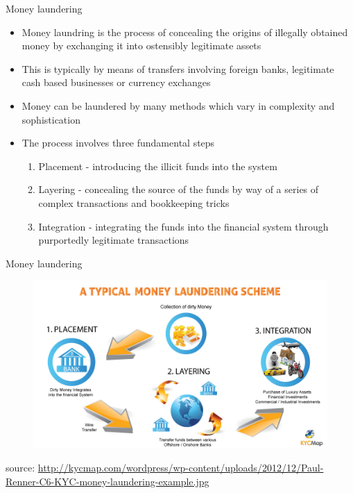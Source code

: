 \documentclass[10pt]{beamer}
\begin{document}
\begin{frame}{Money laundering}
	\begin{itemize}
		\item Money laundring is the process of concealing the origins of illegally obtained money by exchanging it into ostensibly legitimate assets
		\item This is typically by means of transfers involving foreign banks, legitimate cash based businesses or currency exchanges
		\item Money can be laundered by many methods which vary in complexity and sophistication
		\item The process involves three fundamental steps
		\begin{enumerate}
			\item Placement - introducing the illicit funds into the system
			\item Layering - concealing the source of the funds by way of a series of complex transactions and bookkeeping tricks
			\item Integration - integrating the funds into the financial system through purportedly legitimate transactions
		\end{enumerate}
	\end{itemize}
\end{frame}


\begin{frame}{Money laundering}
	\begin{figure}[]
		\centering
		\includegraphics  [width=4.in]{Images/kyc}
	\end{figure}
	\begin{scriptsize}
		source: \href{http://kycmap.com/what-is-money-laundering/}{http://kycmap.com/wordpress/wp-content/uploads/2012/12/Paul-Renner-C6-KYC-money-laundering-example.jpg}
	\end{scriptsize}
\end{frame}
\end{document}
